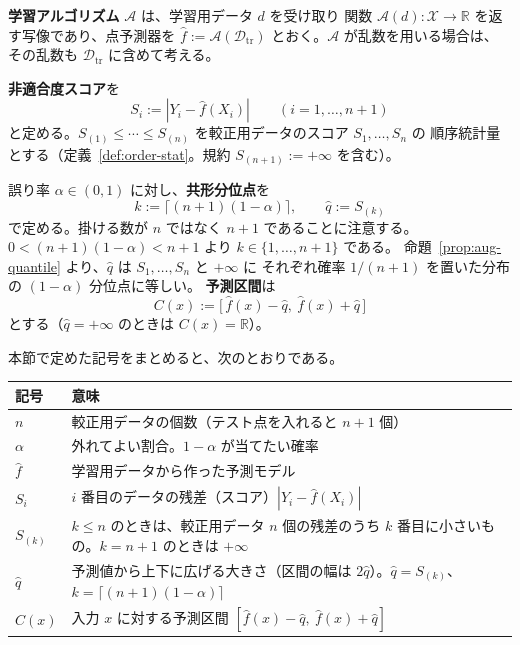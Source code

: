 \documentclass[a4paper,11pt]{jsarticle}
\theoremstyle{definition}
\theoremstyle{plain}
\theoremstyle{remark}
\newcommand{\Real}{\mathbb{R}}
\newcommand{\Dtr}{\mathcal{D}_{\mathrm{tr}}}     %
\newcommand{\qhat}{\hat{q}}
\newcommand{\fhat}{\hat{f}}
\begin{document}
\textbf{学習アルゴリズム} $\mathcal{A}$ は、学習用データ $d$ を受け取り
関数 $\mathcal{A}(d)\colon\mathcal{X}\to\Real$ を返す写像であり、点予測器を
$\fhat:=\mathcal{A}(\Dtr)$ とおく。$\mathcal{A}$ が乱数を用いる場合は、
その乱数も $\Dtr$ に含めて考える。

\textbf{非適合度スコア}を
\begin{equation}
  \label{eq:score}
  S_i := |Y_i-\fhat(X_i)| \qquad (i=1,\dots,n+1)
\end{equation}
と定める。$S_{(1)}\le\cdots\le S_{(n)}$ を較正用データのスコア $S_1,\dots,S_n$ の
順序統計量とする（定義~\ref{def:order-stat}。規約 $S_{(n+1)}:=+\infty$ を含む）。

誤り率 $\alpha\in(0,1)$ に対し、\textbf{共形分位点}を
\begin{equation}
  \label{eq:khat}
  k:=\bigl\lceil (n+1)(1-\alpha)\bigr\rceil, \qquad \qhat:=S_{(k)}
\end{equation}
で定める。掛ける数が $n$ ではなく $n+1$ であることに注意する。
$0<(n+1)(1-\alpha)<n+1$ より $k\in\{1,\dots,n+1\}$ である。
命題~\ref{prop:aug-quantile} より、$\qhat$ は $S_1,\dots,S_n$ と $+\infty$ に
それぞれ確率 $1/(n+1)$ を置いた分布の $(1-\alpha)$ 分位点に等しい。
\textbf{予測区間}は
\begin{equation}
  \label{eq:interval}
  C(x):=\bigl[\,\fhat(x)-\qhat,\ \fhat(x)+\qhat\,\bigr]
\end{equation}
とする（$\qhat=+\infty$ のときは $C(x)=\Real$）。

本節で定めた記号をまとめると、次のとおりである。
\begin{center}
  \begin{tabular}{lp{}}
    \toprule
    記号 & 意味 \\
    \midrule
    $n$ & 較正用データの個数（テスト点を入れると $n+1$ 個） \\
    $\alpha$ & 外れてよい割合。$1-\alpha$ が当てたい確率 \\
    $\fhat$ & 学習用データから作った予測モデル \\
    $S_i$ & $i$ 番目のデータの残差（スコア）$|Y_i-\fhat(X_i)|$ \\
    $S_{(k)}$ & $k\le n$ のときは、較正用データ $n$ 個の残差のうち $k$ 番目に小さいもの。$k=n+1$ のときは $+\infty$ \\
    $\qhat$ & 予測値から上下に広げる大きさ（区間の幅は $2\qhat$）。$\qhat=S_{(k)}$、$k=\lceil(n+1)(1-\alpha)\rceil$ \\
    $C(x)$ & 入力 $x$ に対する予測区間 $[\fhat(x)-\qhat,\ \fhat(x)+\qhat]$ \\
    \bottomrule
  \end{tabular}
\end{center}
\end{document}
